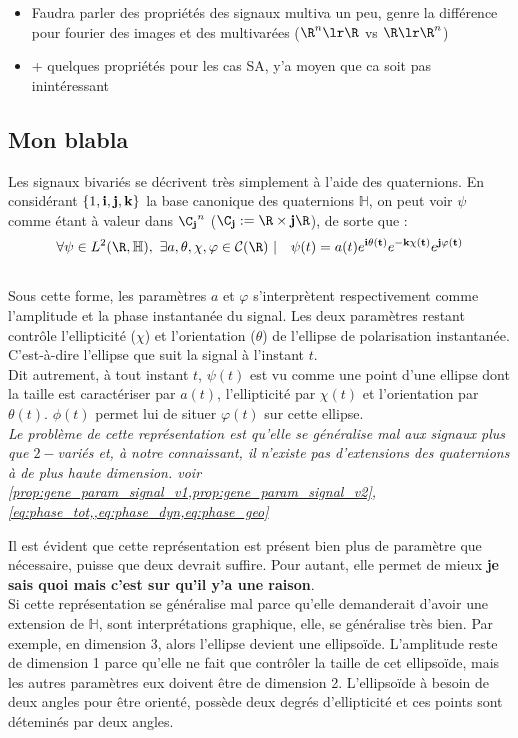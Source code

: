 \begin{itemize}
	
	\item Faudra parler des propriétés des signaux multiva un peu, genre la différence pour fourier des images et des multivarées ($\R^n\lr\R$ vs $\R\lr\R^n$)
	
	\item + quelques propriétés pour les cas SA, y'a moyen que ca soit pas inintéressant
\end{itemize}



\subsection{Mon blabla}\label{subsec:blabla}


\begin{proposition}\label{prop:quatern}
Les signaux bivariés se décrivent très simplement à l'aide des quaternions. En considérant $\{1, \bf{i},\bf{j},\bf{k}\}$ la base canonique des quaternions $\mathbb{H}$, on peut voir $\psi$ comme étant à valeur dans ${\C_{\bf{j}}}^n$ ($\C_{\bf{j}} :=\R\times \bf{j}\R$), de sorte que :
\[\forall \psi\in L^2(\R,\mathbb{H}),\ \exists a,\theta,\chi,\varphi \in\mathcal{C}(\R)\ |\quad \psi(t) = a(t)e^{\bf{i}\theta(t)}e^{-\bf{k}\chi(t)}e^{\bf{j}\varphi(t)}\]
\\
Sous cette forme, les paramètres $a$ et $\varphi$ s'interprètent respectivement comme l'amplitude et la phase instantanée du signal. Les deux paramètres restant contrôle l'ellipticité ($\chi$) et l'orientation ($\theta$) de l’ellipse de polarisation instantanée. C'est-à-dire l'ellipse que suit la signal à l'instant $t$.
\\
Dit autrement, à tout instant $t$, $\psi(t)$ est vu comme une point d'une ellipse dont la taille est caractériser par $a(t)$, l'ellipticité par $\chi(t)$ et l'orientation par $\theta(t)$. $\phi(t)$ permet lui de situer $\varphi(t)$ sur cette ellipse.
\\

\textit{Le problème de cette représentation est qu'elle se généralise mal aux signaux plus que $2-$variés et, à notre connaissant, il n'existe pas d'extensions des quaternions à de plus haute dimension. voir \cref{prop:gene_param_signal_v1,prop:gene_param_signal_v2}, \cref{eq:phase_tot,,eq:phase_dyn,eq:phase_geo}} 
\end{proposition}

Il est évident que cette représentation est présent bien plus de paramètre que nécessaire, puisse que deux devrait suffire. Pour autant, elle permet de mieux \textbf{je sais quoi mais c'est sur qu'il y'a une raison}.
\\
Si cette représentation se généralise mal parce qu'elle demanderait d'avoir une extension de $\mathbb{H}$, sont interprétations graphique, elle, se généralise très bien. Par exemple, en dimension 3, alors l'ellipse devient une ellipsoïde. L'amplitude reste de dimension 1 parce qu'elle ne fait que contrôler la taille de cet ellipsoïde, mais les autres paramètres eux doivent être de dimension 2. L'ellipsoïde à besoin de deux angles pour être orienté, possède deux degrés d'ellipticité et ces points sont déteminés par deux angles.


